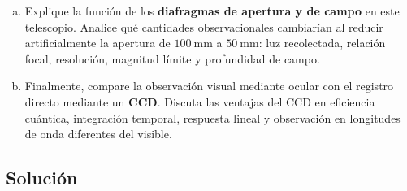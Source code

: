 \begin{enumerate}[a)]
    \item Explique la función de los \textbf{diafragmas de apertura y de campo}
    en este telescopio. Analice qué cantidades observacionales cambiarían al
    reducir artificialmente la apertura de $100~\text{mm}$ a $50~\text{mm}$:
    luz recolectada, relación focal, resolución, magnitud límite y profundidad
    de campo.

    \item Finalmente, compare la observación visual mediante ocular con el
    registro directo mediante un \textbf{CCD}. Discuta las ventajas del CCD en
    eficiencia cuántica, integración temporal, respuesta lineal y observación
    en longitudes de onda diferentes del visible.
\end{enumerate}


\subsection*{Solución}

